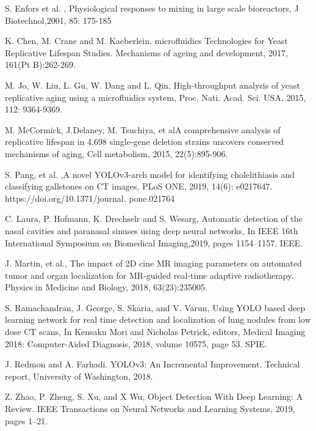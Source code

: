 \documentclass[conference]{IEEEtran}
\begin{document}
\begin{thebibliography}{00}

S. Enfors  et al. , Physiological responses to mixing in large scale bioreactors, J Biotechnol,2001, 85: 175-185



K. Chen, M. Crane and  M. Kaeberlein, microfluidics Technologies for Yeast Replicative Lifespan Studies. Mechanisms of ageing and development, 2017, 161(Pt B):262-269.



 M. Jo, W. Liu, L. Gu, W. Dang and  L. Qin, High-throughput analysis of yeast replicative aging using a microfluidics system, Proc. Nati. Acad. Sci. USA, 2015, 112: 9364-9369.



M. McCormick,  J.Delaney, M. Tsuchiya, et alA comprehensive analysis of replicative lifespan in 4,698 single-gene deletion strains uncovers conserved mechanisms of aging, Cell metabolism, 2015, 22(5):895-906.


S. Pang,  et al. ,A novel YOLOv3-arch model for identifying cholelithiasis and classifying gallstones on CT images, PLoS ONE, 2019, 14(6): e0217647. https://doi.org/10.1371/journal. pone.021764

C.  Laura, P. Hofmann, K. Drechselr  and S. Wesarg, Automatic detection of the nasal cavities and paranasal sinuses using deep neural networks, In IEEE 16th International Symposium on Biomedical Imaging,2019, pages 1154–1157. IEEE.

J. Martin, et al., The impact of 2D cine MR imaging parameters on automated tumor and organ localization for MR-guided real-time adaptive radiotherapy. Physics in Medicine and Biology, 2018, 63(23):235005.

S. Ramachandran, J. George, S. Skaria, and  V. Varun,  Using YOLO based deep learning network for real time detection and localization of lung nodules from low dose CT scans, In Kensaku Mori and Nicholas Petrick, editors, Medical Imaging 2018: Computer-Aided Diagnosis, 2018, volume 10575, page 53. SPIE.

J. Redmon and A. Farhadi. YOLOv3: An Incremental Improvement. Technical report, University of Washington, 2018.

Z. Zhao, P. Zheng, S. Xu, and X Wu, Object Detection With Deep Learning: A Review. IEEE Transactions on Neural Networks and Learning Systems, 2019, pages 1–21.


\end{thebibliography}
\end{document}
